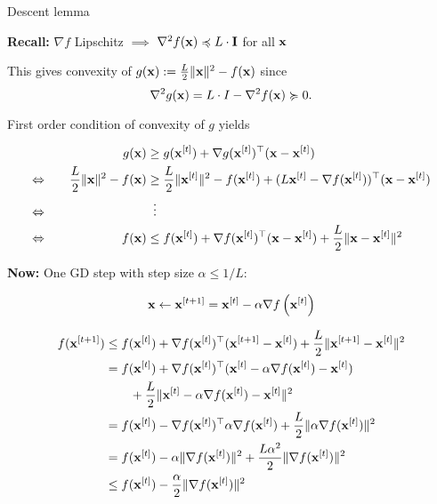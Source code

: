 \documentclass[11pt,compress,t,notes=noshow, xcolor=table]{beamer}
\begin{document}
\begin{vbframe}{Descent lemma}

\textbf{Recall:} $\nabla f$ Lipschitz $\implies$ $\nabla^2 f(\mathbf{x}) \preccurlyeq L \cdot \mathbf{I}$ for all $\mathbf{x}$

\medskip

This gives convexity of $g(\mathbf{x}) := \frac{L}{2}\|\mathbf{x}\|^2 - f(\mathbf{x})$ since $$\nabla^2 g(\mathbf{x}) = L \cdot I - \nabla^2 f(\mathbf{x}) \succcurlyeq 0.$$

First order condition of convexity of $g$ yields

\vspace*{-\baselineskip}

\begin{alignat*}{3}
    && g(\xv) &\geq g(\xv^{[t]}) + \nabla g(\xv^{[t]})^\top (\xv - \xv^{[t]}) \\
    \Leftrightarrow \quad && \frac{L}{2} \|\xv\|^2 - f(\xv) &\geq \frac{L}{2} \|\xv^{[t]}\|^2 - f(\xv^{[t]}) + (L\xv^{[t]} - \nabla f(\xv^{[t]}))^\top (\xv - \xv^{[t]}) \\
    \Leftrightarrow \quad && &\vdotswithin{\geq} \\
    \Leftrightarrow \quad && \fx &\leq f(\xv^{[t]}) + \nabla f(\xv^{[t]})^\top (\xv - \xv^{[t]}) + \frac{L}{2} \|\xv - \xv^{[t]}\|^2
\end{alignat*}

\textbf{Now:} One GD step with step size $\alpha \leq 1/L$:

$$
    \mathbf{x} \leftarrow \mathbf{x}^{[t+1]} = \mathbf{x}^{[t]} - \alpha \nabla f\left(\mathbf{x}^{[t]}\right)
$$

\framebreak

\vspace*{-2\baselineskip}

\begin{small}    
    \begin{align*}
        f(\mathbf{x}^{[t+1]}) &\leq f(\mathbf{x}^{[t]}) + \nabla f(\mathbf{x}^{[t]})^\top(\mathbf{x}^{[t+1]} - \mathbf{x}^{[t]}) + \frac{L}{2} \|\mathbf{x}^{[t+1]} - \mathbf{x}^{[t]}\|^2 \\
        &= f(\mathbf{x}^{[t]}) + \nabla f(\mathbf{x}^{[t]})^\top(\mathbf{x}^{[t]} - \alpha \nabla f(\mathbf{x}^{[t]}) - \mathbf{x}^{[t]}) \\
        &\qquad + \frac{L}{2} \|\mathbf{x}^{[t]} - \alpha \nabla f(\mathbf{x}^{[t]}) - \mathbf{x}^{[t]}\|^2 \\
        &= f(\mathbf{x}^{[t]}) - \nabla f(\mathbf{x}^{[t]})^\top \alpha  \nabla f(\mathbf{x}^{[t]}) + \frac{L}{2} \|\alpha \nabla f(\mathbf{x}^{[t]})\|^2 \\
        &= f(\mathbf{x}^{[t]}) - \alpha \|\nabla f(\mathbf{x}^{[t]})\|^2 + \frac{L \alpha^2}{2} \|\nabla f(\mathbf{x}^{[t]})\|^2 \\
        &\le f(\mathbf{x}^{[t]}) - \frac{\alpha}{2} \|\nabla f(\mathbf{x}^{[t]})\|^2
    \end{align*}


\end{small}
\end{vbframe}
\end{document}
